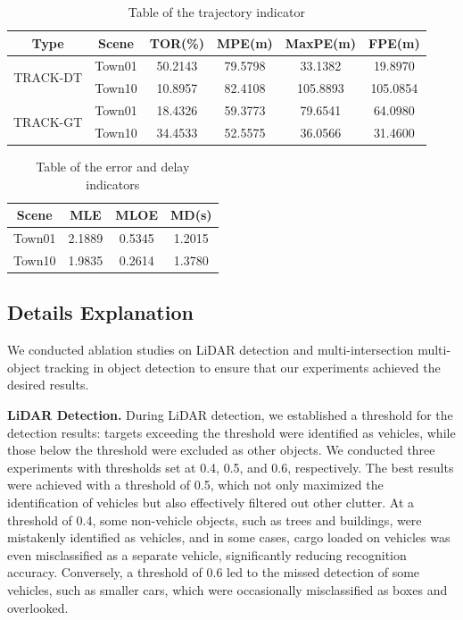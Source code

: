 \documentclass[lettersize,journal]{IEEEtran}
\begin{document}
\begin{table}[t]
	\centering
	\caption{Table of the trajectory indicator}
	\label{tab:improved}
	\begin{tabular}{|c|c|c|c|c|c|}
		\hline
		Type & Scene & TOR(\%) & MPE(m) & MaxPE(m) & FPE(m) \\
		\hline
		\multirow{2}{*}{TRACK-DT} & Town01 & 50.2143 & 79.5798 & 33.1382 & 19.8970 \\
		\cline{2-6}
		& Town10 & 10.8957 & 82.4108 & 105.8893 & 105.0854 \\
		\hline
		\multirow{2}{*}{TRACK-GT} & Town01 & 18.4326 & 59.3773 & 79.6541 & 64.0980 \\
		\cline{2-6}
		& Town10 & 34.4533 & 52.5575 & 36.0566 & 31.4600 \\
		\hline
	\end{tabular}
\end{table}

\begin{table}[t]
	\centering
	\caption{Table of the error and delay indicators}
	\label{tab:improved}
	\begin{tabular}{|c|c|c|c|}
		\hline
		\multicolumn{1}{|c|}{Scene} & \multicolumn{1}{c|}{MLE} & \multicolumn{1}{c|}{MLOE} & \multicolumn{1}{c|}{MD(s)} \\
		\hline
		Town01 & 2.1889 & 0.5345 & 1.2015 \\
		\hline
		Town10 & 1.9835 & 0.2614 & 1.3780 \\
		\hline
	\end{tabular}
\end{table}

\subsection{Details Explanation}

We conducted ablation studies on LiDAR detection and multi-intersection multi-object tracking in object detection to ensure that our experiments achieved the desired results.

\textbf{LiDAR Detection.}
During LiDAR detection, we established a threshold for the detection results: targets exceeding the threshold were identified as vehicles, while those below the threshold were excluded as other objects. 
We conducted three experiments with thresholds set at 0.4, 0.5, and 0.6, respectively. 
The best results were achieved with a threshold of 0.5, which not only maximized the identification of vehicles but also effectively filtered out other clutter. 
At a threshold of 0.4, some non-vehicle objects, such as trees and buildings, were mistakenly identified as vehicles, and in some cases, cargo loaded on vehicles was even misclassified as a separate vehicle, significantly reducing recognition accuracy. 
Conversely, a threshold of 0.6 led to the missed detection of some vehicles, such as smaller cars, which were occasionally misclassified as boxes and overlooked.
\end{document}
